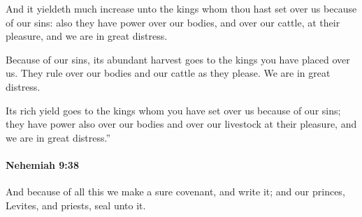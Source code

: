 			\begin{versebox}
					\item[BHS] 
					\item[LXX] 
					\item[ASV] And it yieldeth much increase unto the kings whom thou hast set over us because of our sins: also they have power over our bodies, and over our cattle, at their pleasure, and we are in great distress.
					\item[NIV] Because of our sins, its abundant harvest goes to the kings you have placed over us. They rule over our bodies and our cattle as they please. We are in great distress.
					\item[NRSV] Its rich yield goes to the kings whom you have set over us because of our sins; they have power also over our bodies and over our livestock at their pleasure, and we are in great distress.”
			\end{versebox}

		\paragraph{Nehemiah 9:38} %
			\label{NEHEMIAH-9-38}

			And because of all this we make a sure covenant, and write it; and our princes, Levites, and priests, seal unto it.

